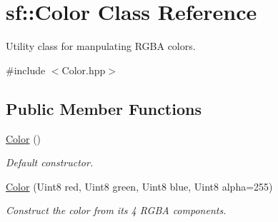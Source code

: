 \hypertarget{classsf_1_1Color}{\section{sf\-:\-:Color Class Reference}
\label{classsf_1_1Color}
}


Utility class for manpulating R\-G\-B\-A colors.  




{\ttfamily \#include $<$Color.\-hpp$>$}

\subsection*{Public Member Functions}
\begin{DoxyCompactItemize}
\item 
\hyperlink{classsf_1_1Color_ac2eb4393fb11ad3fa3ccf34e92fe08e4}{Color} ()
\begin{DoxyCompactList}\small\item\em Default constructor. \end{DoxyCompactList}\item 
\hyperlink{classsf_1_1Color_ac791dc61be4c60baac50fe700f1c9850}{Color} (Uint8 red, Uint8 green, Uint8 blue, Uint8 alpha=255)
\begin{DoxyCompactList}\small\item\em Construct the color from its 4 R\-G\-B\-A components. \end{DoxyCompactList}\end{DoxyCompactItemize}

